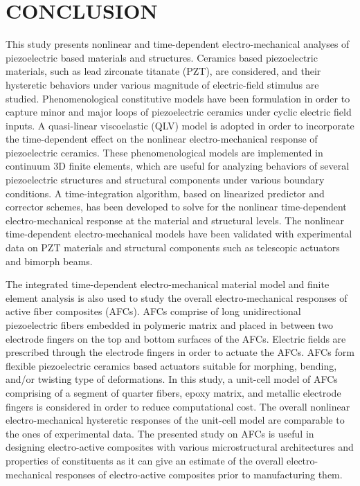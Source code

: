 
\chapter{\uppercase{Conclusion}}  
This study presents nonlinear and time-dependent electro-mechanical analyses of piezoelectric based materials and structures. Ceramics based piezoelectric materials, such as lead zirconate titanate (PZT), are considered, and their hysteretic behaviors under various magnitude of electric-field stimulus are studied. Phenomenological constitutive models have been formulation in order to capture minor and major loops of piezoelectric ceramics under cyclic electric field inputs. A quasi-linear viscoelastic (QLV) model is adopted in order to incorporate the time-dependent effect on the nonlinear electro-mechanical response of piezoelectric ceramics. These phenomenological models are implemented in continuum 3D finite elements, which are useful for analyzing behaviors of several piezoelectric structures and structural components under various boundary conditions. A time-integration algorithm, based on linearized predictor and corrector schemes, has been developed to solve for the nonlinear time-dependent electro-mechanical response at the material and structural levels. The nonlinear time-dependent electro-mechanical models have been validated with experimental data on PZT materials and structural components such as telescopic actuators and bimorph beams.

 
The integrated time-dependent electro-mechanical material model and finite element analysis is also used to study the overall electro-mechanical responses of active fiber composites (AFCs). AFCs comprise of long unidirectional piezoelectric fibers embedded in polymeric matrix and placed in between two electrode fingers on the top and bottom surfaces of the AFCs. Electric fields are prescribed through the electrode fingers in order to actuate the AFCs. AFCs form flexible piezoelectric ceramics based actuators suitable for morphing, bending, and/or twisting type of deformations. In this study, a unit-cell model of AFCs comprising of a segment of quarter fibers, epoxy matrix, and metallic electrode fingers is considered in order to reduce computational cost. The overall nonlinear electro-mechanical hysteretic responses of the unit-cell model are comparable to the ones of experimental data. The presented study on AFCs is useful in designing electro-active composites with various microstructural architectures and properties of constituents as it can give an estimate of the overall electro-mechanical responses of electro-active composites prior to manufacturing them.

